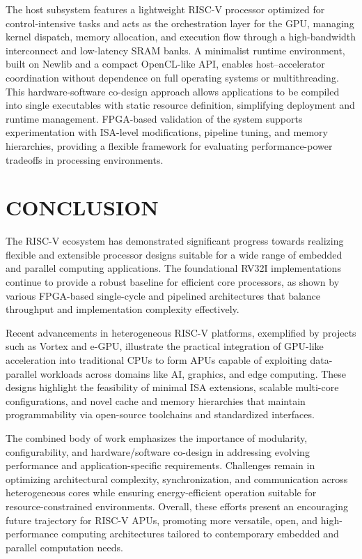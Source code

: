 \documentclass[a4paper,twoside]{article}
\begin{document}
The host subsystem features a lightweight RISC-V processor optimized for control-intensive tasks and acts as the orchestration layer for the GPU, managing kernel dispatch, memory allocation, and execution flow through a high-bandwidth interconnect and low-latency SRAM banks. A minimalist runtime environment, built on Newlib and a compact OpenCL-like API, enables host–accelerator coordination without dependence on full operating systems or multithreading. This hardware-software co-design approach allows applications to be compiled into single executables with static resource definition, simplifying deployment and runtime management. FPGA-based validation of the system supports experimentation with ISA-level modifications, pipeline tuning, and memory hierarchies, providing a flexible framework for evaluating performance-power tradeoffs in processing environments.

\section{\uppercase{Conclusion}}
The RISC-V ecosystem has demonstrated significant progress towards realizing flexible and extensible processor designs suitable for a wide range of embedded and parallel computing applications. The foundational RV32I implementations continue to provide a robust baseline for efficient core processors, as shown by various FPGA-based single-cycle and pipelined architectures that balance throughput and implementation complexity effectively.

Recent advancements in heterogeneous RISC-V platforms, exemplified by projects such as Vortex and e-GPU, illustrate the practical integration of GPU-like acceleration into traditional CPUs to form APUs capable of exploiting data-parallel workloads across domains like AI, graphics, and edge computing. These designs highlight the feasibility of minimal ISA extensions, scalable multi-core configurations, and novel cache and memory hierarchies that maintain programmability via open-source toolchains and standardized interfaces.

The combined body of work emphasizes the importance of modularity, configurability, and hardware/software co-design in addressing evolving performance and application-specific requirements. Challenges remain in optimizing architectural complexity, synchronization, and communication across heterogeneous cores while ensuring energy-efficient operation suitable for resource-constrained environments. Overall, these efforts present an encouraging future trajectory for RISC-V APUs, promoting more versatile, open, and high-performance computing architectures tailored to contemporary embedded and parallel computation needs.
\end{document}
